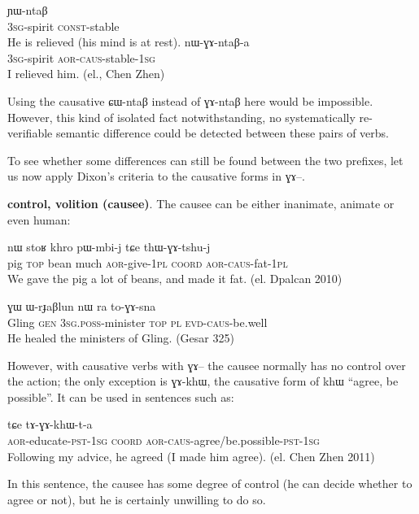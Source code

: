 \documentclass[oldfontcommands,oneside,a4paper,11pt]{memoir}
\newcommand{\ipa}[1]{{\phon #1}} %
\newcommand{\aor}{\textsc{aor}}
\newcommand{\caus}{\textsc{caus}}
\newcommand{\coord}{\textsc{coord}}
\newcommand{\const}{\textsc{const}}
\newcommand{\evd}{\textsc{evd}}
\newcommand{\gen}{\textsc{gen}}
\newcommand{\pl}{\textsc{pl}}
\newcommand{\poss}{\textsc{poss}}
\newcommand{\pst}{\textsc{pst}}
\newcommand{\sg}{\textsc{sg}}
\newcommand{\topic}{\textsc{top}}
\begin{document}
    \begin{exe}
   \ex 
  \gll    \ipa{ɯ-sɯm} \ipa{ɲɯ-ntaβ}   \\
  3\sg{}-spirit \const{}-stable \\
 \glt   He is relieved (his mind is at rest).
\gll    \ipa{ɯ-sɯm} \ipa{nɯ-ɣɤ-ntaβ-a}   \\
  3\sg{}-spirit \aor{}-\caus{}-stable-1\sg{} \\
 \glt   I relieved him. (el., Chen Zhen)
   \end{exe} 
Using the causative \ipa{ɕɯ-ntaβ} instead of \ipa{ɣɤ-ntaβ} here would be impossible. However, this kind of isolated fact notwithstanding, no systematically re-verifiable semantic difference could be detected between these pairs of verbs.




To see whether some differences can still be found between the two prefixes, let us now apply Dixon's criteria to the causative forms in \ipa{ɣɤ}--.

 \textbf{control, volition (causee)}. The causee can be either inanimate, animate or even human:
   \begin{exe}
   \ex 
\gll  \ipa{paʁ}  	\ipa{nɯ}  	\ipa{stoʁ}  	\ipa{khro}  	\ipa{pɯ-mbi-j}  	\ipa{tɕe}  	\ipa{thɯ-ɣɤ-tshu-j}  \\
 pig \topic{} bean much \aor{}-give-1\pl{} \coord{} \aor{}-\caus{}-fat-1\pl{}\\
 \glt We gave the pig a lot of beans, and made it fat. (el. Dpalcan 2010)
   \end{exe} 
    \begin{exe}
   \ex 
\gll \ipa{ʁlaŋ}  	\ipa{ɣɯ}  	\ipa{ɯ-rɟaβlun}  	\ipa{nɯ}  	\ipa{ra}  	\ipa{to-ɣɤ-sna}      \\
Gling \gen{} 3\sg{}.\poss{}-minister \topic{} \pl{} \evd{}-\caus{}-be.well  \\
 \glt  He healed the ministers of Gling. (Gesar 325)
   \end{exe} 

   However, with causative verbs with \ipa{ɣɤ}--   the causee normally has no control over the action; the only exception is \ipa{ɣɤ-khɯ}, the causative form of \ipa{khɯ} ``agree, be possible''. It can be used in sentences such as:
   \begin{exe}
   \ex 
\gll    \ipa{tɤ-ndzɯmbra-t-a} \ipa{tɕe} \ipa{tɤ-ɣɤ-khɯ-t-a}\\
 \aor{}-educate-\pst{}-1\sg{} \coord{} \aor{}-\caus{}-agree/be.possible-\pst{}-1\sg{}\\
 \glt   Following my advice, he agreed (I made him agree). (el. Chen Zhen 2011)
   \end{exe} 
  In this sentence, the causee has some degree of control (he can decide whether to agree or not), but he is certainly unwilling to do so.
  
\end{document}
